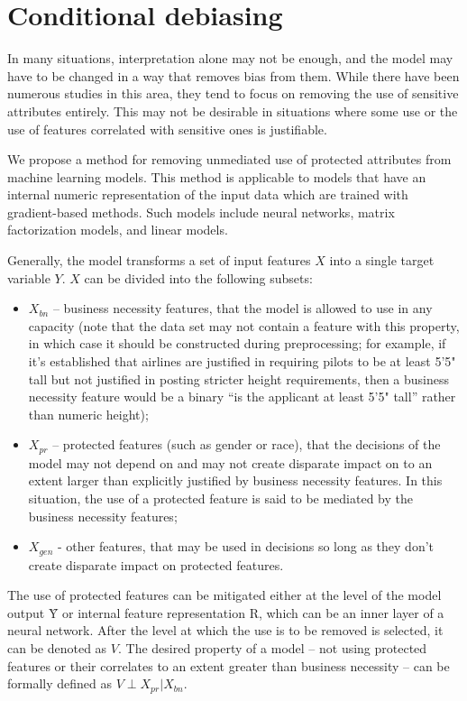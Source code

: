 \section{Conditional debiasing}

In many situations, interpretation alone may not be enough, and the model may
have to be changed in a way that removes bias from them. While there have been
numerous studies in this area, they tend to focus on removing the use of
sensitive attributes entirely. This may not be desirable in situations where
some use or the use of features correlated with sensitive ones is justifiable.

We propose a method for removing unmediated use of protected attributes from
machine learning models. This method is applicable to models that have an
internal numeric representation of the input data which are trained with
gradient-based methods. Such models include neural networks, matrix
factorization models, and linear models.

Generally, the model transforms a set of input features $X$ into a single target
variable $Y$. $X$ can be divided into the following subsets:

\begin{itemize}
	\item
		$X_{bn}$ -- business necessity features, that the model is
		allowed to use in any capacity (note that the data set may not
		contain a feature with this property, in which case it should be
		constructed during preprocessing; for example, if it’s
		established that airlines are justified in requiring pilots to
		be at least 5'5" tall but not justified in posting stricter
		height requirements, then a business necessity feature would be
		a binary ``is the applicant at least 5'5" tall'' rather than
		numeric height);
	\item
		$X_{pr}$ -- protected features (such as gender or race), that
		the decisions of the model may not depend on and may not create
		disparate impact on to an extent larger than explicitly 
		justified by business necessity features. In this situation, the
		use of a protected feature is said to be mediated by the
		business necessity features;
	\item
		$X_{gen}$ - other features, that may be used in decisions so
		long as they don’t create disparate impact on protected features.
\end{itemize}

The use of protected features can be mitigated either at the level of the model
output $Ŷ$ or internal feature representation R, which can be an inner layer of a
neural network. After the level at which the use is to be removed is selected,
it can be denoted as $V$. The desired property of a model -- not using protected
features or their correlates to an extent greater than business necessity -- can
be formally defined as $V\perp X_{pr}|X_{bn}$.

